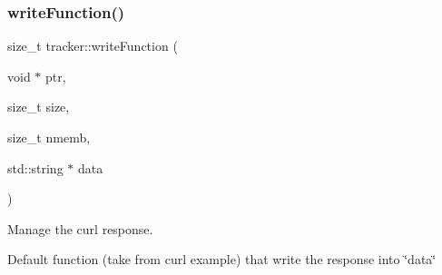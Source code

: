\subsubsection{\texorpdfstring{write\+Function()}{writeFunction()}}
{\footnotesize\ttfamily size\+\_\+t tracker\+::write\+Function (\begin{DoxyParamCaption}\item[{void $\ast$}]{ptr,  }\item[{size\+\_\+t}]{size,  }\item[{size\+\_\+t}]{nmemb,  }\item[{std\+::string $\ast$}]{data }\end{DoxyParamCaption})}



Manage the curl response. 

Default function (take from curl example) that write the response into \char`\"{}data\char`\"{} 